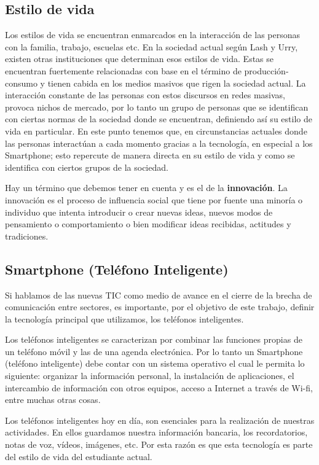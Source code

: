 	\subsection{Estilo de vida}
	Los estilos de vida se encuentran enmarcados en la interacción de las personas con la familia, trabajo, escuelas etc. En la sociedad actual según Lash y Urry, existen otras instituciones que determinan esos estilos de vida\cite{03}. Estas se encuentran fuertemente relacionadas con base en el término de  producción-consumo y tienen cabida en los medios masivos que rigen la sociedad actual. La interacción constante de las personas con estos discursos en redes masivas, provoca nichos de mercado, por lo tanto un grupo de personas que se identifican con ciertas normas de la sociedad donde se encuentran, definiendo así su estilo de vida en particular. En este punto tenemos que, en circunstancias actuales donde las personas interactúan a cada momento gracias a la tecnología, en especial a los Smartphone; esto repercute de manera directa en su estilo de vida y como se identifica con ciertos grupos de la sociedad. 
	
	Hay un término que debemos tener en cuenta y es el de la \textbf{innovación}. La innovación  es el proceso de influencia social que tiene por fuente una minoría o individuo que intenta introducir o crear nuevas ideas, nuevos modos de pensamiento o comportamiento o bien modificar ideas recibidas, actitudes y tradiciones\cite{04}.
	 
	\subsection{Smartphone (Teléfono Inteligente)}
	Si hablamos de las nuevas TIC como medio de avance en el cierre de la brecha de comunicación entre sectores, es importante,  por el objetivo de este trabajo, definir la tecnología principal que utilizamos, los teléfonos inteligentes.
	
	Los teléfonos inteligentes se caracterizan por combinar las funciones propias de un teléfono móvil y las de una agenda electrónica. Por lo tanto un Smartphone (teléfono inteligente) debe contar con un sistema operativo el cual le permita lo siguiente:
	organizar la información personal, la instalación de aplicaciones, el intercambio de información con otros equipos, acceso a Internet a través de Wi-fi, entre muchas otras cosas\cite{05}.
	
	Los teléfonos inteligentes hoy en día, son esenciales para la realización de nuestras actividades. En ellos guardamos nuestra información bancaria, los recordatorios, notas de voz, vídeos, imágenes, etc. Por esta razón es que esta tecnología es parte del estilo de vida del estudiante actual.

